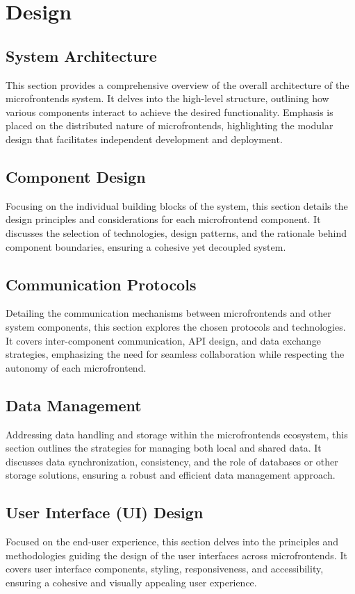 \chapter{Design}
\label{chap:Design}

\section{System Architecture}
This section provides a comprehensive overview of the overall architecture of the microfrontends system. It delves into the high-level structure, outlining how various components interact to achieve the desired functionality. Emphasis is placed on the distributed nature of microfrontends, highlighting the modular design that facilitates independent development and deployment.

\section{Component Design}
Focusing on the individual building blocks of the system, this section details the design principles and considerations for each microfrontend component. It discusses the selection of technologies, design patterns, and the rationale behind component boundaries, ensuring a cohesive yet decoupled system.

\section{Communication Protocols}
Detailing the communication mechanisms between microfrontends and other system components, this section explores the chosen protocols and technologies. It covers inter-component communication, API design, and data exchange strategies, emphasizing the need for seamless collaboration while respecting the autonomy of each microfrontend.

\section{Data Management}
Addressing data handling and storage within the microfrontends ecosystem, this section outlines the strategies for managing both local and shared data. It discusses data synchronization, consistency, and the role of databases or other storage solutions, ensuring a robust and efficient data management approach.

\section{User Interface (UI) Design}
Focused on the end-user experience, this section delves into the principles and methodologies guiding the design of the user interfaces across microfrontends. It covers user interface components, styling, responsiveness, and accessibility, ensuring a cohesive and visually appealing user experience.

